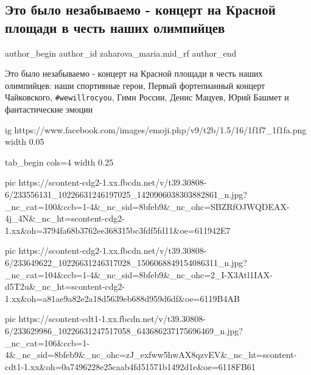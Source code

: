  
 
 
 
 
 
\subsection{Это было незабываемо - концерт на Красной  площади в честь наших олимпийцев}
\label{sec:08_08_2021.fb.zaharova_maria.mid_rf.1.koncert_olimpijcy}
 
\ifcmt
 author_begin
   author_id zaharova_maria.mid_rf
 author_end
\fi

Это было незабываемо - концерт на Красной  площади в честь наших олимпийцев:
наши спортивные герои, Первый фортепианный концерт Чайковского, \verb|#wewillrocyou|,
Гимн России, Денис Мацуев, Юрий Башмет и фантастические эмоции 

\ifcmt
  ig https://www.facebook.com/images/emoji.php/v9/t2b/1.5/16/1f1f7_1f1fa.png
  width 0.05
\fi

\ifcmt
  tab_begin cols=4
    width 0.25

     pic https://scontent-cdg2-1.xx.fbcdn.net/v/t39.30808-6/233556131_10226631246197025_1420906038303882861_n.jpg?_nc_cat=100&ccb=1-4&_nc_sid=8bfeb9&_nc_ohc=SBZRfOJWQDEAX-4j_4N&_nc_ht=scontent-cdg2-1.xx&oh=3794fa68b3762ee368315bc3fdf5fd11&oe=611942E7

     pic https://scontent-cdg2-1.xx.fbcdn.net/v/t39.30808-6/233649622_10226631246317028_1506068849154086311_n.jpg?_nc_cat=104&ccb=1-4&_nc_sid=8bfeb9&_nc_ohc=2_I-X3Atl1IAX-d5T2u&_nc_ht=scontent-cdg2-1.xx&oh=a81ae9a82e2a18d5639eb688d959d6df&oe=6119B4AB

     pic https://scontent-cdt1-1.xx.fbcdn.net/v/t39.30808-6/233629986_10226631247517058_643686237175696469_n.jpg?_nc_cat=106&ccb=1-4&_nc_sid=8bfeb9&_nc_ohc=zJ_exfww5hwAX8qzvEV&_nc_ht=scontent-cdt1-1.xx&oh=0a7496228e25caab4fd51571b1492d1e&oe=6118FB61

